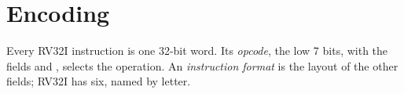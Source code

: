 \label{out:b2:assembly-and-calling-convention:switch}

\section{Encoding}\label{sec:b2:assembly-and-calling-convention:encoding}

\begin{definition}\label{def:b2:assembly-and-calling-convention:format}
Every RV32I instruction is one 32-bit word. Its \emph{opcode}, the low 7 bits, with the fields
 and , selects the operation. An \emph{instruction format} is
the layout of the other fields; RV32I has six, named by letter.
\end{definition}

